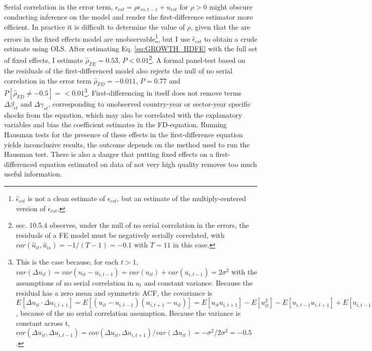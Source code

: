 \documentclass[a4paper]{article}
\begin{document}
Serial correlation in the error term, $\epsilon_{cst} = \rho \epsilon_{cs,t-1} + u_{cst}$ for $\rho > 0$ might obscure conducting inference on the model and render the first-difference estimator more efficient. In practice it is difficult to determine the value of $\rho$, given that the are errors in the fixed effects model are unobservable\footnote{$\hat{\epsilon}_{cst}$ is not a clean estimate of $\epsilon_{cst}$, but an estimate of the multiply-centered version of $\epsilon_{cst}$.}, but I use $\hat{\epsilon}_{cst}$ to obtain a crude estimate using OLS. After estimating Eq. \ref{eq:GROWTH_HDFE} with the full set of fixed effects, I estimate $\hat{\rho}_{FE} = 0.53$, $P<0.01$\footnote{\citet{wooldridge2010econometric} sec. 10.5.4 observes, under the null of no serial correlation in the errors, the residuals of a FE model must be negatively serially correlated, with $cor(\hat{u}_{it}, \hat{u}_{is})=-1/(T-1) = -0.1$ with $T = 11$ in this case.}. A formal panel-test based on the residuals of the first-differenced model also rejects the null of no serial correlation in the error term $\hat{\rho}_{FD} = -0.011$, $P=0.77$ and $P[\hat{\rho}_{FD} \neq -0.5]=<0.01$\footnote{This is the case because, for each $t > 1$, $var(\Delta u_{it}) = var(u_{it} - u_{i,t-1}) = var(u_{it}) + var(u_{i,t-1}) = 2\sigma^2$ with the assumptions of no serial correlation in $u_t$ and constant variance. Because the residual has a zero mean and symmetric ACF, the covariance is $E[\Delta u_{it}⋅\Delta u_{i,t+1}] = E[(u_{it} - u_{i,t-1})(u_{i,t+1} - u_{it})] = E[u_{it} u_{i,t+1}] - E[u_{it}^2] - E[u_{i,t-1} u_{i,t+1}] + E[u_{i,t-1} u_{it}] = -E[u_{it}^2] = -\sigma^2$, because of the no serial correlation assumption. Because the variance is constant across t, $cor(\Delta u_{it},  \Delta u_{i,t-1}) = cov(\Delta u_{it},  \Delta u_{i,t+1})/var(\Delta u_{it}) = -\sigma^2/2\sigma^2 = -0.5$.}. First-differencing in itself does not remove terms $\Delta\beta_{ct}$ and $\Delta\gamma_{st}$, corresponding to unobserved country-year or sector-year specific shocks from the equation, which may also be correlated with the explanatory variables and bias the coefficient estimates in the FD-equation. Running Hausman tests for the presence of these effects in the first-difference equation yields inconclusive results, the outcome depends on the method used to run the Hausman test. There is also a danger that putting fixed effects on a first-differenced equation estimated on data of not very high quality removes too much useful information.   \newline
\end{document}
